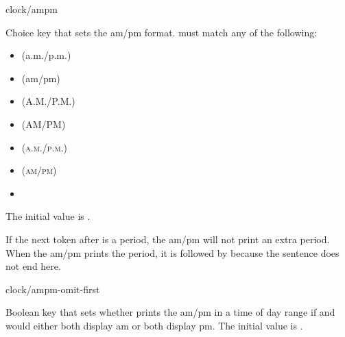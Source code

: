 \documentclass{beery}
\begin{document}
\begin{variable}{clock/ampm}
  \begin{syntax}
  \end{syntax}
  \listheading
    {
      Choice key that sets the am/pm format.
       must match any of the following:
    }
  \begin{itemize}
    \item {} (a.m./p.m.)
    \item {} (am/pm)
    \item {} (A.M./P.M.)
    \item {} (AM/PM)
    \item {} (\textsc{a}.\textsc{m}./\textsc{p}.\textsc{m}.)
    \item {} (\textsc{am}/\textsc{pm})
    \item {}
  \end{itemize}
  The initial value is .

  If the next token after  is a period, the am/pm will not print an extra period.
  When the am/pm prints the period, it is followed by  because the sentence does not end here.
\end{variable}

\begin{variable}{clock/ampm-omit-first}
  \begin{syntax}
  \end{syntax}
  Boolean key that sets whether  prints the am/pm in a time of day range if  and  would either both display am or both display pm.
  The initial value is .
\end{variable}
\end{document}
